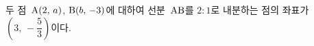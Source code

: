 두 점~$\mathrm{A}(2,\,a)$, $\mathrm{B}(b,\,-3)$에 대하여 선분~$\mathrm{AB}$를 $2:1$로 내분하는 점의 좌표가 $\left(3,\,-\dfrac{5}{3}\right)$이다.

